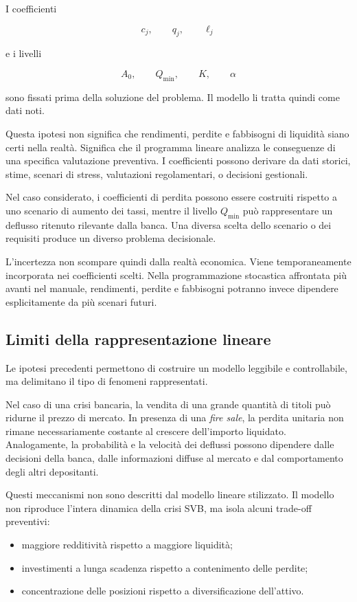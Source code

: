 I coefficienti

\[
c_j,
\qquad
q_j,
\qquad
\ell_j
\]

\noindent e i livelli

\[
A_0,
\qquad
Q_{\min},
\qquad
K,
\qquad
\alpha
\]

\noindent sono fissati prima della soluzione del problema. Il modello li tratta quindi
come dati noti.

Questa ipotesi non significa che rendimenti, perdite e fabbisogni di
liquidit\`a siano certi nella realt\`a. Significa che il programma lineare
analizza le conseguenze di una specifica valutazione preventiva. I
coefficienti possono derivare da dati storici, stime, scenari di stress,
valutazioni regolamentari, o decisioni gestionali.

Nel caso considerato, i coefficienti di perdita possono essere costruiti
rispetto a uno scenario di aumento dei tassi, mentre il livello
$Q_{\min}$ pu\`o rappresentare un deflusso ritenuto rilevante dalla banca.
Una diversa scelta dello scenario o dei requisiti produce un diverso problema
decisionale.

L'incertezza non scompare quindi dalla realt\`a economica. Viene
temporaneamente incorporata nei coefficienti scelti. Nella
programmazione stocastica affrontata pi\`u avanti nel manuale, rendimenti, perdite e fabbisogni potranno invece
dipendere esplicitamente da pi\`u scenari futuri.

\subsection{Limiti della rappresentazione lineare}

Le ipotesi precedenti permettono di costruire un modello leggibile e
controllabile, ma delimitano il tipo di fenomeni rappresentati.

Nel caso di una crisi bancaria, la vendita di una grande quantit\`a di titoli
pu\`o ridurne il prezzo di mercato. In presenza di una \emph{fire sale}, la
perdita unitaria non rimane necessariamente costante al crescere dell'importo
liquidato. Analogamente, la probabilit\`a e la velocit\`a dei deflussi possono
dipendere dalle decisioni della banca, dalle informazioni diffuse al mercato
e dal comportamento degli altri depositanti.

Questi meccanismi non sono descritti dal modello lineare stilizzato. Il modello
non riproduce l'intera dinamica della crisi SVB, ma isola alcuni trade-off
preventivi:

\begin{itemize}

\item maggiore redditivit\`a rispetto a maggiore liquidit\`a;

\item investimenti a lunga scadenza rispetto a contenimento delle perdite;

\item concentrazione delle posizioni rispetto a diversificazione dell'attivo.

\end{itemize}


